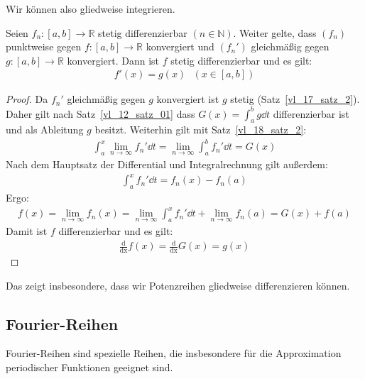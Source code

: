 \begin{Bemerkung}{
	Wir können also gliedweise integrieren.
}\end{Bemerkung}

\begin{Satz}{
	Seien $f_n : [a,b] \rightarrow \mathbb{R}$ stetig differenzierbar $(n \in 
	\mathbb{N})$. Weiter gelte, dass $(f_n)$ punktweise gegen $f:[a,b] \rightarrow 
	\mathbb{R}$ konvergiert und $(f_n')$ gleichmäßig gegen 
	$g:[a,b] \rightarrow \mathbb{R}$ konvergiert. Dann ist $f$ stetig 
	differenzierbar und es gilt:
	\begin{align*}
		f'(x) = g(x) \text{ } (x \in [a,b])
	\end{align*}
}\end{Satz}

\begin{proof}
	Da $f_n'$ gleichmäßig gegen $g$ konvergiert ist $g$ stetig (Satz~\ref{vl_17_satz_2}).
	Daher gilt nach Satz~\ref{vl_12_satz_01} dass 
	$G(x) = \int_a^b g \dd{t}$ differenzierbar ist und als Ableitung $g$ besitzt. 
	Weiterhin gilt mit Satz~\ref{vl_18_satz_2}:
	\begin{align*}
		\int_a^x \lim\limits_{n \rightarrow \infty}{f_n'} \dd{t} = 
		\lim\limits_{n\rightarrow \infty}{\int_a^b f_n' \dd{t}} = G(x)
	\end{align*}
	Nach dem Hauptsatz der Differential und Integralrechnung gilt außerdem:
	\begin{align*}
		\int_a^x f_n' \dd{t} = f_n(x) -f_n(a) 
	\end{align*}
	Ergo:
	\begin{align*}
		f(x) = \lim\limits_{n \rightarrow \infty}{f_n(x)} = 
		\lim\limits_{n \rightarrow \infty} \int_a^x f_n' \dd{t} + 
		\lim\limits_{n \rightarrow \infty}{f_n(a)} = G(x) + f(a)
	\end{align*}
	Damit ist $f$ differenzierbar und es gilt: 
	\begin{align*}
		\frac{\mathrm{d}}{\mathrm{dx}}f(x) 
	= \frac{\mathrm{d}}{\mathrm{dx}}G(x) = g(x)
	\end{align*}		
\end{proof}

\begin{Bemerkung}{
	Das zeigt insbesondere, dass wir Potenzreihen gliedweise differenzieren können.
}\end{Bemerkung}

\subsection{Fourier-Reihen}
Fourier-Reihen sind spezielle Reihen, die insbesondere für die Approximation 
periodischer Funktionen geeignet sind. 


